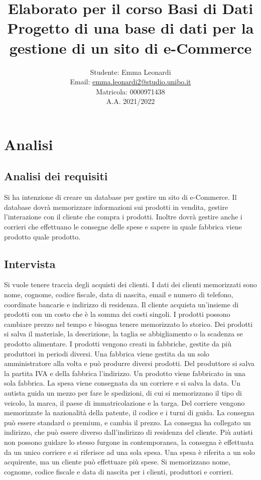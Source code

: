 \documentclass[a4paper,12pt]{report}
\title{Elaborato per il corso Basi di Dati\\ \small Progetto di una base di dati per la gestione di un sito di e-Commerce}
\author{
    Studente: Emma Leonardi\\
    Email: \url{emma.leonardi2@studio.unibo.it}\\
    Matricola: 0000971438\\
    A.A. 2021/2022
    }
\date{}
\begin{document}
\maketitle
\tableofcontents

\chapter{Analisi}
\section{Analisi dei requisiti}
Si ha intenzione di creare un database per gestire un sito di e-Commerce.
Il database dovrà memorizzare informazioni sui prodotti in vendita, gestire l'interazione con il cliente che compra i prodotti. 
Inoltre dovrà gestire anche i corrieri che effettuano le consegne delle spese e sapere in quale fabbrica viene prodotto quale prodotto.
\section{Intervista}
Si vuole tenere traccia degli acquisti dei clienti. I dati dei clienti memorizzati sono nome, cognome, codice fiscale, data di nascita, 
email e numero di telefono, coordinate bancarie e indirizzo di residenza.
Il cliente acquista un'insieme di prodotti con un costo che è la somma dei costi singoli. 
I prodotti possono cambiare prezzo nel tempo e bisogna tenere memorizzato lo storico. 
Dei prodotti si salva il materiale, la descrizione, la taglia se abbigliamento o la scadenza se prodotto alimentare. 
I prodotti vengono creati in fabbriche, gestite da più produttori in periodi diversi. Una fabbrica viene gestita da un solo amministratore alla volta e può produrre diversi prodotti. 
Del produttore si salva la partita IVA e della fabbrica l'indirizzo. Un prodotto viene fabbricato in una sola fabbrica.
La spesa viene consegnata da un corriere e si salva la data. Un autista guida un mezzo per fare le spedizioni, di cui si memorizzano il tipo di veicolo, la marca, il paese di immatricolazione e la targa.
Del corriere vengono memorizzate la nazionalità della patente, il codice e i turni di guida. La consegna può essere standard o premium, e cambia il prezzo.
La consegna ha collegato un indirizzo, che può essere diverso dall'indirizzo di residenza del cliente. Più autisti non possono guidare lo stesso furgone in contemporanea, la consegna è effettuata da un unico corriere 
e si riferisce ad una sola spesa. Una spesa è riferita a un solo acquirente, ma un cliente può effettuare più spese. 
Si memorizzano nome, cognome, codice fiscale e data di nascita per i clienti, produttori e corrieri.
\end{document}
